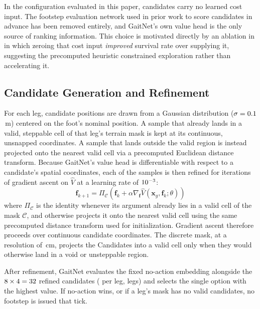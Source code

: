In the configuration evaluated in this paper, candidates carry no
learned cost input. The footstep evaluation network used in prior
work \cite{Sullivan2025} to score candidates in advance has been
removed entirely, and GaitNet's own value head is the only source of
ranking information. This choice is motivated directly by an
ablation in \cite{Sullivan2025} in which zeroing that cost input
\emph{improved} survival rate over supplying it, suggesting the
precomputed heuristic constrained exploration rather than
accelerating it.

\subsection{Candidate Generation and Refinement}
\label{subsec:methodology-gaitnet-gradient-ascent}

For each leg, \numberstringnum{\corlCandidatesPerLeg} candidate
positions are drawn from a Gaussian distribution
($\sigma = 0.1$\,m) centered on the foot's nominal
position. A sample that already lands in a valid, steppable
cell of that leg's terrain mask is kept at its continuous, unsnapped
coordinates. A sample that lands outside the valid region is instead
projected onto the nearest valid cell via a precomputed Euclidean
distance transform. Because GaitNet's value head is differentiable
with respect to a candidate's spatial coordinates, each of the
\numberstringnum{\corlCandidatesPerLeg} samples is then refined for
\numberstringnum{\corlGradientAscentIters} iterations of gradient
ascent on $\hat V$ at a learning rate of $10^{-3}$:
\begin{equation}
  \mathbf{f}_{k+1} = \Pi_{\mathcal{C}} \left( \mathbf{f}_k + \alpha
  \nabla_{\mathbf{f}} \hat{V}(\mathbf{x}_g, \mathbf{f}_k; \theta) \right)
\end{equation}
where $\Pi_{\mathcal{C}}$ is the identity whenever its argument already
lies in a valid cell of the mask $\mathcal{C}$, and otherwise projects
it onto the nearest valid cell using the same precomputed distance
transform used for initialization. Gradient ascent therefore proceeds
over continuous candidate coordinates. The discrete mask, at a
resolution of \corlMaskResolutionCm\,cm, projects the Candidates
into a valid cell only when they would otherwise land in a void or
unsteppable region.

After refinement, GaitNet evaluates the fixed no-action embedding
alongside the
$8 \times 4 = 32$
refined candidates (\numberstringnum{\corlCandidatesPerLeg} per leg,
\numberstringnum{\corlNumLegs} legs) and selects the single option
with the highest value. If no-action wins, or if a leg's mask has no
valid candidates, no footstep is issued that tick.

